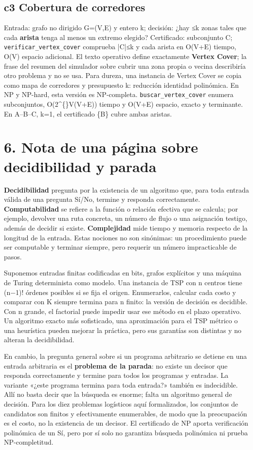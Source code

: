 \documentclass[12pt,a4paper]{article}
\begin{document}
\subsection{c3 Cobertura de corredores}

Entrada: grafo no dirigido G=(V,E) y entero k; decisión: ¿hay ≤k zonas tales que cada \textbf{arista} tenga al menos un extremo elegido? Certificado: subconjunto C; \texttt{verificar\_vertex\_cover} comprueba |C|≤k y cada arista en O(V+E) tiempo, O(V) espacio adicional. El texto operativo define exactamente \textbf{Vertex Cover}; la frase del resumen del simulador sobre cubrir una zona propia o vecina describiría otro problema y no se usa. Para dureza, una instancia de Vertex Cover se copia como mapa de corredores y presupuesto k: reducción identidad polinómica. En NP y NP-hard, esta versión es NP-completa. \texttt{buscar\_vertex\_cover} enumera subconjuntos, O(2\textasciicircum\{\}V(V+E)) tiempo y O(V+E) espacio, exacto y terminante. En A–B–C, k=1, el certificado \{B\} cubre ambas aristas.


\clearpage
\section{6. Nota de una página sobre decidibilidad y parada}

\textbf{Decidibilidad} pregunta por la existencia de un algoritmo que, para toda entrada válida de una pregunta Sí/No, termine y responda correctamente. \textbf{Computabilidad} se refiere a la función o relación efectiva que se calcula; por ejemplo, devolver una ruta concreta, un número de flujo o una asignación testigo, además de decidir si existe. \textbf{Complejidad} mide tiempo y memoria respecto de la longitud de la entrada. Estas nociones no son sinónimas: un procedimiento puede ser computable y terminar siempre, pero requerir un número impracticable de pasos.


Suponemos entradas finitas codificadas en bits, grafos explícitos y una máquina de Turing determinista como modelo. Una instancia de TSP con n centros tiene (n−1)! órdenes posibles si se fija el origen. Enumerarlos, calcular cada costo y comparar con K siempre termina para n finito: la versión de decisión es decidible. Con n grande, el factorial puede impedir usar ese método en el plazo operativo. Un algoritmo exacto más sofisticado, una aproximación para el TSP métrico o una heurística pueden mejorar la práctica, pero sus garantías son distintas y no alteran la decidibilidad.


En cambio, la pregunta general sobre si un programa arbitrario se detiene en una entrada arbitraria es el \textbf{problema de la parada}: no existe un decisor que responda correctamente y termine para todos los programas y entradas. La variante «¿este programa termina para toda entrada?» también es indecidible. Allí no basta decir que la búsqueda es enorme; falta un algoritmo general de decisión. Para los diez problemas logísticos aquí formalizados, los conjuntos de candidatos son finitos y efectivamente enumerables, de modo que la preocupación es el costo, no la existencia de un decisor. El certificado de NP aporta verificación polinómica de un Sí, pero por sí solo no garantiza búsqueda polinómica ni prueba NP-completitud.
\end{document}
